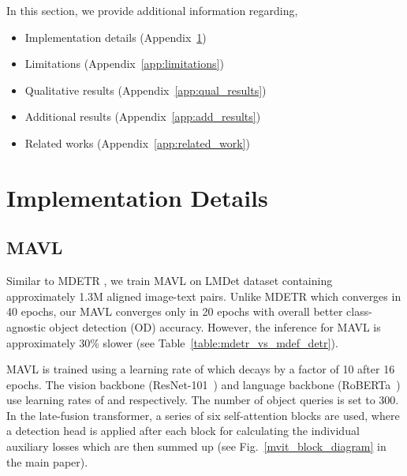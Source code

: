 \documentclass[runningheads]{llncs}
\begin{document}
In this section, we provide additional information regarding,
\begin{itemize}
\item Implementation details (Appendix~\ref{app:imp_detail})
    \item Limitations (Appendix~\ref{app:limitations})
    \item Qualitative results (Appendix~\ref{app:qual_results})
    \item Additional results (Appendix~\ref{app:add_results})
    \item Related works (Appendix~\ref{app:related_work})
\end{itemize}

\section{Implementation Details}\label{app:imp_detail}
\subsection{MAVL}\label{app:imp_detail_mdef}
Similar to MDETR \cite{mdetr}, we train MAVL on LMDet dataset containing approximately 1.3M aligned image-text pairs. Unlike MDETR which converges in 40 epochs, our MAVL converges only in 20 epochs with overall better class-agnostic object detection (OD) accuracy. However, the inference for MAVL is approximately 30\% slower (see Table~\ref{table:mdetr_vs_mdef_detr}).

MAVL is trained using a learning rate of  which decays by a factor of 10 after 16 epochs. The vision backbone (ResNet-101~\cite{he2016deep}) and language backbone (RoBERTa~\cite{roberta}) use learning rates of  and  respectively. The number of object queries is set to 300. In the late-fusion transformer, a series of six self-attention blocks are used, where a detection head is applied after each block for calculating the individual auxiliary losses which are then summed up (see Fig.~\ref{mvit_block_diagram} in the main paper).

\begin{table}[!ht]
\caption{Comparison of MDETR \cite{mdetr} and MAVL (ours) in terms of convergence epochs, parameters, inference speed and class-agnostic OD performance on COCO \cite{coco} dataset. MAVL converges in half epochs with better accuracy at the cost of slightly slower inference. The frames per second (FPS) are measured on a Quadro RTX 6000 GPU by averaging the time for  inference passes.}
\begin{center}
\end{center}
\label{table:mdetr_vs_mdef_detr}
\end{table}
\end{document}
